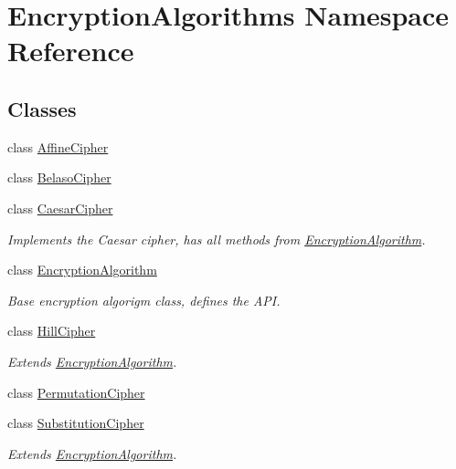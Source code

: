 \hypertarget{namespaceEncryptionAlgorithms}{}\section{Encryption\+Algorithms Namespace Reference}
\label{namespaceEncryptionAlgorithms}
\subsection*{Classes}
\begin{DoxyCompactItemize}
\item 
class \mbox{\hyperlink{classEncryptionAlgorithms_1_1AffineCipher}{Affine\+Cipher}}
\item 
class \mbox{\hyperlink{classEncryptionAlgorithms_1_1BelasoCipher}{Belaso\+Cipher}}
\item 
class \mbox{\hyperlink{classEncryptionAlgorithms_1_1CaesarCipher}{Caesar\+Cipher}}
\begin{DoxyCompactList}\small\item\em Implements the Caesar cipher, has all methods from \mbox{\hyperlink{classEncryptionAlgorithms_1_1EncryptionAlgorithm}{Encryption\+Algorithm}}. \end{DoxyCompactList}\item 
class \mbox{\hyperlink{classEncryptionAlgorithms_1_1EncryptionAlgorithm}{Encryption\+Algorithm}}
\begin{DoxyCompactList}\small\item\em Base encryption algorigm class, defines the A\+PI. \end{DoxyCompactList}\item 
class \mbox{\hyperlink{classEncryptionAlgorithms_1_1HillCipher}{Hill\+Cipher}}
\begin{DoxyCompactList}\small\item\em Extends \mbox{\hyperlink{classEncryptionAlgorithms_1_1EncryptionAlgorithm}{Encryption\+Algorithm}}. \end{DoxyCompactList}\item 
class \mbox{\hyperlink{classEncryptionAlgorithms_1_1PermutationCipher}{Permutation\+Cipher}}
\item 
class \mbox{\hyperlink{classEncryptionAlgorithms_1_1SubstitutionCipher}{Substitution\+Cipher}}
\begin{DoxyCompactList}\small\item\em Extends \mbox{\hyperlink{classEncryptionAlgorithms_1_1EncryptionAlgorithm}{Encryption\+Algorithm}}. \end{DoxyCompactList}\end{DoxyCompactItemize}
